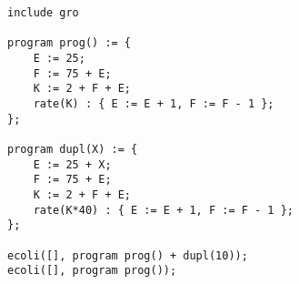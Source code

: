 \lstset{style=GROSRC}
\begin{lstlisting}
include gro

program prog() := {
    E := 25;
    F := 75 + E;
    K := 2 + F + E;
    rate(K) : { E := E + 1, F := F - 1 };
};

program dupl(X) := {
    E := 25 + X;
    F := 75 + E;
    K := 2 + F + E;
    rate(K*40) : { E := E + 1, F := F - 1 };
};

ecoli([], program prog() + dupl(10));
ecoli([], program prog());
\end{lstlisting}
